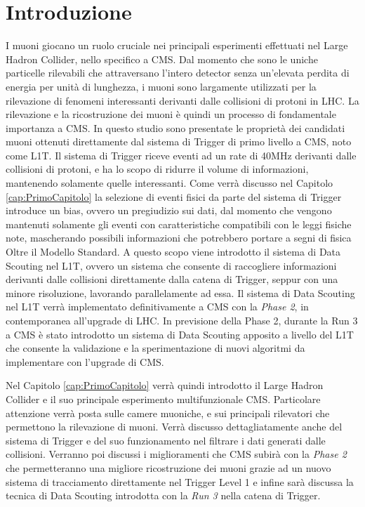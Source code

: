 \chapter{Introduzione}
\label{cap:Introduzione}

I muoni giocano un ruolo cruciale nei principali esperimenti effettuati nel Large Hadron Collider, nello specifico a CMS. Dal momento che sono le uniche particelle rilevabili che attraversano l'intero detector senza un'elevata perdita di energia per unità di lunghezza, i muoni sono largamente utilizzati per la rilevazione di fenomeni interessanti derivanti dalle collisioni di protoni in LHC. La rilevazione e la ricostruzione dei muoni è quindi un processo di fondamentale importanza a CMS.\newline
In questo studio sono presentate le proprietà dei candidati muoni ottenuti direttamente dal sistema di Trigger di primo livello a CMS, noto come L1T. Il sistema di Trigger riceve eventi ad un rate di 40MHz derivanti dalle collisioni di protoni, e ha lo scopo di ridurre il volume di informazioni, mantenendo solamente quelle interessanti.
Come verrà discusso nel Capitolo \ref{cap:PrimoCapitolo} la selezione di eventi fisici da parte del sistema di Trigger introduce un bias, ovvero un pregiudizio sui dati, dal momento che vengono mantenuti solamente gli eventi con caratteristiche compatibili con le leggi fisiche note, mascherando possibili informazioni che potrebbero portare a segni di fisica Oltre il Modello Standard. A questo scopo viene introdotto il sistema di Data Scouting nel L1T, ovvero un sistema che consente di raccogliere informazioni derivanti dalle collisioni direttamente dalla catena di Trigger, seppur con una minore risoluzione, lavorando parallelamente ad essa. Il sistema di Data Scouting nel L1T verrà implementato definitivamente a CMS con la \textit{Phase 2}, in contemporanea all'upgrade di LHC. In previsione della Phase 2, durante la Run 3 a CMS è stato introdotto un sistema di Data Scouting apposito a livello del L1T che consente la validazione e la sperimentazione di nuovi algoritmi da implementare con l'upgrade di CMS.

Nel Capitolo \ref{cap:PrimoCapitolo} verrà quindi introdotto il Large Hadron Collider e il suo principale esperimento multifunzionale CMS. Particolare attenzione verrà posta sulle camere muoniche, e sui principali rilevatori che permettono la rilevazione di muoni. Verrà discusso dettagliatamente anche del sistema di Trigger e del suo funzionamento nel filtrare i dati generati dalle collisioni. Verranno poi discussi i miglioramenti che CMS subirà con la \textit{Phase 2} che permetteranno una migliore ricostruzione dei muoni grazie ad un nuovo sistema di tracciamento direttamente nel Trigger Level 1 e infine sarà discussa la tecnica di Data Scouting introdotta con la \textit{Run 3} nella catena di Trigger.


